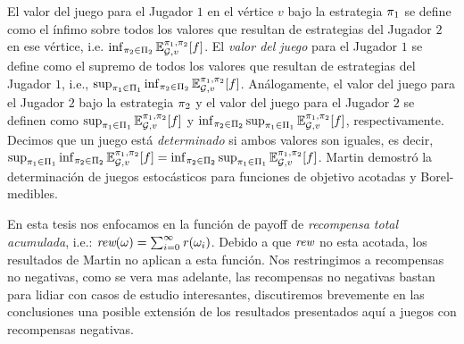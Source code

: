 	El valor del juego para el Jugador $1$ en el vértice $v$ bajo la estrategia $\pi_{1}$ se define como el ínfimo sobre todos los valores que resultan de estrategias del Jugador $2$ en ese vértice, i.e. $\inf_{\pi_{2} \in \Pi_{2}} \mathbb{E}^{\pi_{1}, \pi_{2}}_{\mathcal{G},v}[f]$.
El \emph{valor del juego} para el Jugador $1$ se define como el supremo de todos los valores que resultan de estrategias del Jugador $1$, i.e., $\sup_{\pi_{1} \in \Pi_{1}} \inf_{\pi_{2} \in \Pi_{2}} \mathbb{E}^{\pi_{1}, \pi_{2}}_{\mathcal{G},v}[f]$.
Análogamente, el valor del juego para el Jugador $2$ bajo la estrategia $\pi_{2}$ y el valor del juego para el Jugador $2$ se definen como $\sup_{\pi_{1} \in \Pi_{1}}  \mathbb{E}^{\pi_{1}, \pi_{2}}_{\mathcal{G},v}[f]$ 
y $\inf_{\pi_{2} \in \Pi_{2}} \sup_{\pi_{1} \in \Pi_{1}}  \mathbb{E}^{\pi_{1}, \pi_{2}}_{\mathcal{G},v}[f]$, respectivamente. Decimos que un juego está \emph{determinado} si ambos valores son iguales, es decir,
	$\sup_{\pi_{1} \in \Pi_{1}} \inf_{\pi_{2} \in \Pi_{2}} \mathbb{E}^{\pi_{1}, \pi_{2}}_{\mathcal{G},v}[f]
	=
	\inf_{\pi_{2} \in \Pi_{2}} \sup_{\pi_{1} \in \Pi_{1}} \mathbb{E}^{\pi_{1}, \pi_{2}}_{\mathcal{G},v}[f]$.
	Martin \cite{Martin98} demostró la determinación de juegos estocásticos para funciones de objetivo acotadas y Borel-medibles.
	
	En esta tesis nos enfocamos en la función de payoff de \emph{recompensa total acumulada}, i.e.: $\textit{rew}(\omega) = \sum^\infty_{i=0} \mathit{r}(\omega_i)$. Debido a que $\textit{rew}$ no esta acotada, los resultados de Martin \cite{Martin98} no aplican a esta función. Nos restringimos a recompensas no negativas, como se vera mas adelante, las recompensas no negativas bastan para lidiar con casos de estudio interesantes, discutiremos brevemente en las conclusiones una posible extensión de los resultados presentados aquí a juegos con recompensas negativas.

	

